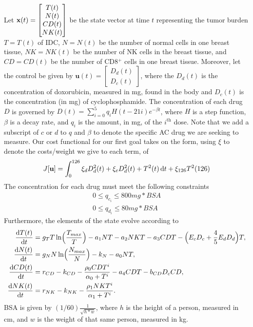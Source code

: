 \documentclass[12pt, oneside]{article}   	%
\begin{document}
Let $\mathbf{x}(t) = \begin{bmatrix} T(t) \\ N(t) \\ CD(t) \\ NK(t)\end{bmatrix}$ be the state vector at time $t$ representing the tumor burden $T=T(t)$ of IDC, $N=N(t)$ be the number of normal cells in one breast tissue, $NK=NK(t)$ be the number of NK cells in the breast tissue, and $CD=CD(t)$ be the number of CD8$^+$ cells in one breast tissue.
Moreover, let the control be given by $\mathbf{u}(t) = \begin{bmatrix} D_d(t) \\ D_c(t) \end{bmatrix}$, where the $D_d(t)$ is the concentration of doxorubicin, measured in mg, found in the body and $D_c(t)$ is the concentration (in mg) of cyclophosphamide.
The concentration of each drug $D$ is governed by $D(t)=\sum_{i=0}^{5}q_iH(t - 21i)e^{-\beta t}$, where $H$ is a step function, $\beta$ is a decay rate, and $q_i$ is the amount, in mg, of the $i^\text{th}$ dose.
Note that we add a subscript of $c$ or $d$ to $q$ and $\beta$ to denote the specific AC drug we are seeking to measure.
Our cost functional for our first goal takes on the form, using $\xi$ to denote the costs/weight we give to each term, of
\begin{align*}
	J[\mathbf{u}] = \int_0^{126} \xi_d D_d^2(t) + \xi_c D_d^2(t) + T^2(t) \mathop{}\!\mathrm{d} t + \xi_{126} T^2(126)
\end{align*}
The concentration for each drug must meet the following constraints
\begin{align*}
	0 \le q_{c_i} \le 800mg*BSA \\
	0 \le q_{d_i} \le 80mg*BSA
\end{align*}
Furthermore, the elements of the state evolve according to 
\begin{align*}
	\frac{\diff T(t)}{\diff t} &= g_T T \ln \Bigl( \frac{T_{max}}{T} \Bigr)- a_1NT - a_2NKT - a_3CDT - \Bigl(E_c D_c +\frac{4}{5}E_d D_d \Bigr)T, \\
	\frac{\diff N(t)}{\diff t} &= g_N N \ln\Bigl(\frac{N_{max}}{N} \Bigr) - k_N - a_0NT, \\
	\frac{\diff CD(t)}{\diff t} &= r_{CD} - k_{CD} - \frac{\rho_0 CDT ^ i}{\alpha_0 + T^i} - a_4CDT - b_{CD}D_cCD, \\
	\frac{\diff NK(t)}{\diff t} &=r_{NK} - k_{NK} - \frac{\rho _1NKT^i}{\alpha_1 + T^i}. \\
\end{align*}
BSA is given by $(1/60)\frac{1}{\sqrt{h * w}}$, where $h$ is the height of a person, measured in cm, and $w$ is the weight of that same person, measured in kg.
\end{document}
